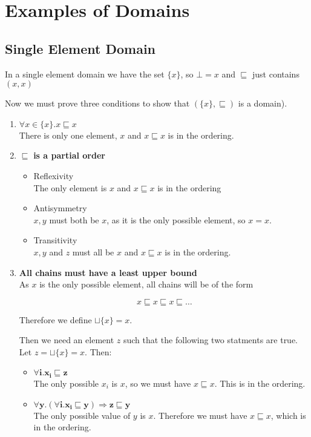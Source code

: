 
\section{Examples of Domains}
\subsection{Single Element Domain}
In a single element domain we have the set $\{x\}$, so $\bot = x$ and $\sqsubseteq$ just contains $(x,x)$

Now we must prove three conditions to show that $(\{x\},\sqsubseteq)$ is a domain).

\begin{enumerate}
\item{$\forall x \in \{x\}. x \sqsubseteq x$\\
There is only one element, $x$ and $x \sqsubseteq x$ is in the ordering.}
\item{$\sqsubseteq$ \textbf{is a partial order}
\begin{itemize}
\item{Reflexivity\\
The only element is $x$ and $x \sqsubseteq x$ is in the ordering}
\item{Antisymmetry\\
 $x,y$ must both be $x$, as it is the only possible element, so $x = x$.}
\item{Transitivity\\
 $x,y$ and $z$ must all be $x$ and $x \sqsubseteq x$ is in the ordering.}
\end{itemize}}
\item{\textbf{All chains must have a least upper bound}\\
As $x$ is the only possible element, all chains will be of the form 

\[ x \sqsubseteq x  \sqsubseteq x  \sqsubseteq \dots \]

Therefore we define $\sqcup \{x\} = x$.

Then we need an element $z$ such that the following two statments are true. Let $z = \sqcup\{x\} = x$. Then:

\begin{itemize}
\item{$\mathbf{\forall i. x_i \sqsubseteq z}$ \\
The only possible $x_i$ is $x$, so we must have $x \sqsubseteq x$. This is in the ordering.}
\item{$\mathbf{\forall y. (\forall i . x_i \sqsubseteq y) \Rightarrow z \sqsubseteq y}$\\
The only possible value of $y$ is $x$. Therefore we must have $x \sqsubseteq x$, which is in the ordering.}
\end{itemize}}
\end{enumerate}

